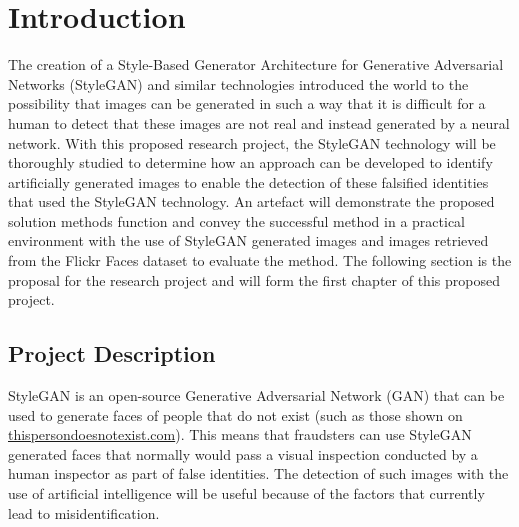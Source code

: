 \chapter{Introduction}\label{ch1}

The creation of a Style-Based Generator Architecture for Generative Adversarial Networks (StyleGAN) and similar technologies introduced the world to the possibility that images can be generated in such a way that it is difficult for a human to detect that these images are not real and instead generated by a neural network. With this proposed research project, the StyleGAN technology will be thoroughly studied to determine how an approach can be developed to identify artificially generated images to enable the detection of these falsified identities that used the StyleGAN technology. An artefact will demonstrate the proposed solution methods function and convey the successful method in a practical environment with the use of StyleGAN generated images and images retrieved from the Flickr Faces dataset to evaluate the method. The following section is the proposal for the research project and will form the first chapter of this proposed project.






\section{Project Description}

StyleGAN is an open-source Generative Adversarial Network (GAN) that can be used to generate faces of people that do not exist (such as those shown on \href{https://www.thispersondoesnotexist.com}{thispersondoesnotexist.com}). This means that fraudsters can use StyleGAN generated faces that normally would pass a visual inspection conducted by a human inspector as part of false identities. The detection of such images with the use of artificial intelligence will be useful because of the factors that currently lead to misidentification.

